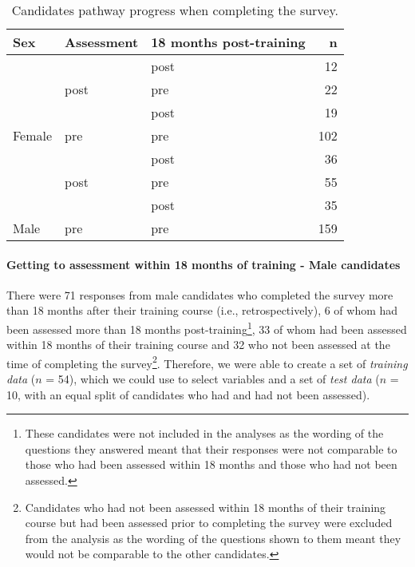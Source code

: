 \documentclass[a4paper,]{book}
\let\oldparagraph\paragraph
\renewcommand{\paragraph}[1]{\oldparagraph{#1}\mbox{}}
\begin{document}
\begin{table}

\caption{\label{tab:g5-candidate-survey-time}Candidates pathway progress when completing the survey.}
\centering
\begin{tabular}[t]{lllr}
\toprule
Sex & Assessment & 18 months post-training & n\\
\midrule
 &  & post & 12\\
\cmidrule{3-4}
 & \multirow[t]{-2}{*}{\raggedright\arraybackslash post} & pre & 22\\
\cmidrule{2-4}
 &  & post & 19\\
\cmidrule{3-4}
\multirow[t]{-4}{*}{\raggedright\arraybackslash Female} & \multirow[t]{-2}{*}{\raggedright\arraybackslash pre} & pre & 102\\
\cmidrule{1-4}
 &  & post & 36\\
\cmidrule{3-4}
 & \multirow[t]{-2}{*}{\raggedright\arraybackslash post} & pre & 55\\
\cmidrule{2-4}
 &  & post & 35\\
\cmidrule{3-4}
\multirow[t]{-4}{*}{\raggedright\arraybackslash Male} & \multirow[t]{-2}{*}{\raggedright\arraybackslash pre} & pre & 159\\
\bottomrule
\end{tabular}
\end{table}

\hypertarget{getting-to-assessment-within-18-months-of-training---male-candidates}{%
\paragraph{Getting to assessment within 18 months of training - Male candidates}\label{getting-to-assessment-within-18-months-of-training---male-candidates}}

There were 71 responses from male candidates who completed the survey more than 18 months after their training course (i.e., retrospectively), 6 of whom had been assessed more than 18 months post-training\footnote{These candidates were not included in the analyses as the wording of the questions they answered meant that their responses were not comparable to those who had been assessed within 18 months and those who had not been assessed.}, 33 of whom had been assessed within 18 months of their training course and 32 who not been assessed at the time of completing the survey\footnote{Candidates who had not been assessed within 18 months of their training course but had been assessed prior to completing the survey were excluded from the analysis as the wording of the questions shown to them meant they would not be comparable to the other candidates.}. Therefore, we were able to create a set of \emph{training data} (\(n\) = 54), which we could use to select variables and a set of \emph{test data} (\(n\) = 10, with an equal split of candidates who had and had not been assessed).
\end{document}
